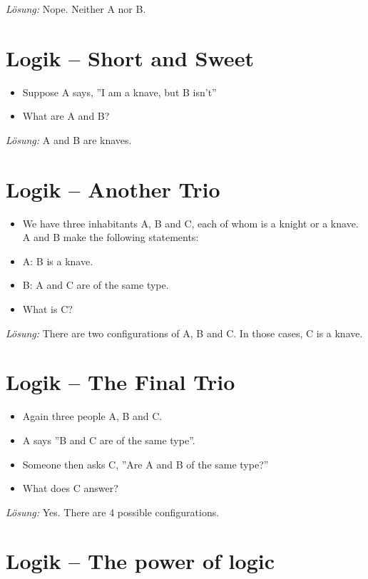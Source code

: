 \documentclass[11pt,a4paper]{article}
\theoremstyle{area}
\begin{document}
\emph{Lösung:} Nope. Neither A nor B.

\section{Logik -- Short and Sweet}

\begin{itemize}
  \item Suppose A says, ''I am a knave, but B isn't''
  \item What are A and B?
\end{itemize}

\emph{Lösung:} A and B are knaves.

\section{Logik -- Another Trio}

\begin{itemize}
  \item We have three inhabitants A, B and C, each of whom is a knight
    or a knave. A and B make the following statements:
  \item A: B is a knave.
  \item B: A and C are of the same type.
  \item What is C?
\end{itemize}

\emph{Lösung:} There are two configurations of A, B and C. In those cases,
    C is a knave.


\section{Logik -- The Final Trio}

\begin{itemize}
  \item Again three people A, B and C.
  \item A says ''B and C are of the same type''.
  \item Someone then asks C, ''Are A and B of the same type?''
  \item What does C answer?
\end{itemize}

\emph{Lösung:} Yes. There are 4 possible configurations.

\section{Logik -- The power of logic}
\end{document}
